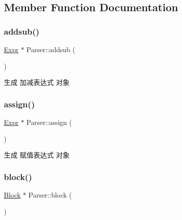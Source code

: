 \subsection{Member Function Documentation}
\mbox{\label{class_parser_a198213e9e10727dab4b6f54ee781958b}} 
\subsubsection{\texorpdfstring{addsub()}{addsub()}}
{\footnotesize\ttfamily \hyperlink{class_expr}{Expr} $\ast$ Parser\+::addsub (\begin{DoxyParamCaption}{ }\end{DoxyParamCaption})\hspace{0.3cm}{\ttfamily [protected]}}



生成 加减表达式 对象 

\mbox{\label{class_parser_a24a9ce00f5db17f1e2b2019d6791a7e3}} 
\subsubsection{\texorpdfstring{assign()}{assign()}}
{\footnotesize\ttfamily \hyperlink{class_expr}{Expr} $\ast$ Parser\+::assign (\begin{DoxyParamCaption}{ }\end{DoxyParamCaption})\hspace{0.3cm}{\ttfamily [protected]}}



生成 赋值表达式 对象 

\mbox{\label{class_parser_a2e96322fd6d40261ab256a726634c1b3}} 
\subsubsection{\texorpdfstring{block()}{block()}}
{\footnotesize\ttfamily \hyperlink{class_block}{Block} $\ast$ Parser\+::block (\begin{DoxyParamCaption}{ }\end{DoxyParamCaption})\hspace{0.3cm}{\ttfamily [protected]}}



